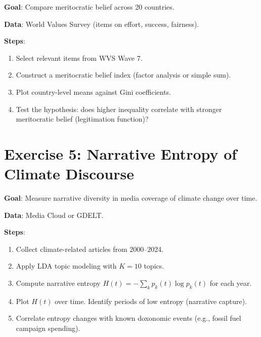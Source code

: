 \textbf{Goal}: Compare meritocratic belief across 20 countries.

\textbf{Data}: World Values Survey (items on effort, success, fairness).

\textbf{Steps}:
\begin{enumerate}[nosep]
  \item Select relevant items from WVS Wave 7.
  \item Construct a meritocratic belief index (factor analysis or simple sum).
  \item Plot country-level means against Gini coefficients.
  \item Test the hypothesis: does higher inequality correlate with stronger meritocratic belief (legitimation function)?
\end{enumerate}

\section*{Exercise 5: Narrative Entropy of Climate Discourse}

\textbf{Goal}: Measure narrative diversity in media coverage of climate change over time.

\textbf{Data}: Media Cloud or GDELT.

\textbf{Steps}:
\begin{enumerate}[nosep]
  \item Collect climate-related articles from 2000--2024.
  \item Apply LDA topic modeling with $K = 10$ topics.
  \item Compute narrative entropy $H(t) = -\sum_k p_k(t) \log p_k(t)$ for each year.
  \item Plot $H(t)$ over time. Identify periods of low entropy (narrative capture).
  \item Correlate entropy changes with known doxonomic events (e.g., fossil fuel campaign spending).
\end{enumerate}
